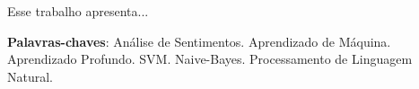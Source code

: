 \newpage
\begin{resumo}
 Esse trabalho apresenta... 
 \vspace{\onelineskip}
 
 \noindent
 \textbf{Palavras-chaves}:  Análise de Sentimentos. Aprendizado de Máquina. Aprendizado Profundo. SVM. Naive-Bayes. Processamento de Linguagem Natural.

\end{resumo}
\newpage